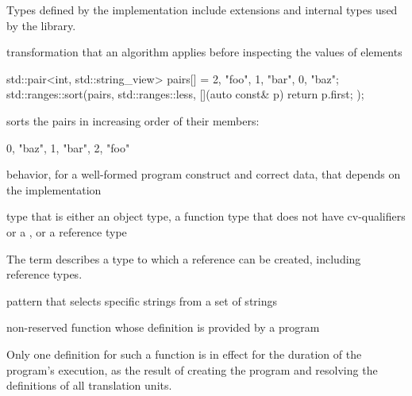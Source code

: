 \begin{defnote}
Types defined by the implementation include
extensions and internal types used by the library.
\end{defnote}

%
transformation that an algorithm applies
before inspecting the values of elements

\begin{example}
\begin{codeblock}
std::pair<int, std::string_view> pairs[] = {{2, "foo"}, {1, "bar"}, {0, "baz"}};
std::ranges::sort(pairs, std::ranges::less{}, [](auto const& p) { return p.first; });
\end{codeblock}
sorts the pairs in increasing order of their  members:
\begin{codeblock}
{{0, "baz"}, {1, "bar"}, {2, "foo"}}
\end{codeblock}
\end{example}

%
behavior, for a well-formed program
construct and correct data, that depends on the implementation

%
type that is either an
object type, a function type that does not have cv-qualifiers or a
, or a reference type

\begin{defnote}
The term describes a type to which a reference can be created,
including reference types.
\end{defnote}

pattern that selects specific strings
from a set of  strings

%
non-reserved function
whose definition is provided by a \Cpp{} program

\begin{defnote}
Only one definition for such a function is in effect for the duration of the program's
execution, as the result of creating the program and resolving the
definitions of all translation units.
\end{defnote}


